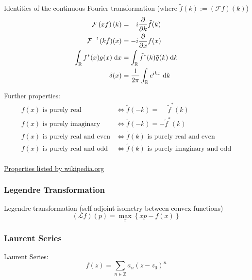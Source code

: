 			\noindent
			Identities of the continuous Fourier transformation (where $\tilde{f}(k) := \left(\mathcal{F}f\right)(k)$)
			\begin{equation}
				\begin{aligned}
					\mathcal{F}\left(xf\right)(k) &= \phantom{-}i \frac{\partial }{\partial k}\tilde{f}(k) \\
					\mathcal{F}^{-1}(k\tilde{f})(x) &= -i\frac{\partial }{\partial x}f(x) \\
					\int_{\mathbb{R}} f^{*}(x) g(x)\;\mathrm{d} x &=
					\int_{\mathbb{R}}\tilde{f}^{*}(k)\tilde{g}(k)\;\mathrm{d} k \\
					\delta(x) &= \frac{1}{2\pi}\int_{\mathbb{R}}e^{\mathrm{i} kx}\;\mathrm{d} k \\
					\label{Eq:FourierIdentities}
				\end{aligned}
			\end{equation}

			\noindent
			Further properties:
			\begin{equation}
				\begin{aligned}
					f(x)\text{ is purely real} &\Leftrightarrow \tilde{f}(-k) = \phantom{-}\tilde{f}^*(k) \\
					f(x)\text{ is purely imaginary} &\Leftrightarrow \tilde{f}(-k) = -\tilde{f}^*(k) \\
					f(x)\text{ is purely real and even} &\Leftrightarrow \tilde{f}(k)\text{ is purely real and even} \\
					f(x)\text{ is purely real and odd} &\Leftrightarrow \tilde{f}(k)\text{ is purely imaginary and odd} \\
				\end{aligned}
			\end{equation}

			\noindent
			\href{https://en.wikipedia.org/wiki/Fourier_transform#Functional_relationships,_one-dimensional}{Properties listed by wikipedia.org}

		\subsubsection{Legendre Transformation}
			\noindent
			Legendre transformation (self-adjoint isometry between convex functions)
			\begin{equation}
				(\mathcal{L}f)(p)=\max_x\left\lbrace xp-f(x) \right\rbrace
			\end{equation}


		\subsubsection{Laurent Series}
			\noindent
			Laurent Series:
			\begin{equation}
				f(z)=\sum_{n\in\mathbb{Z}} a_n(z-z_0)^n
			\end{equation}

